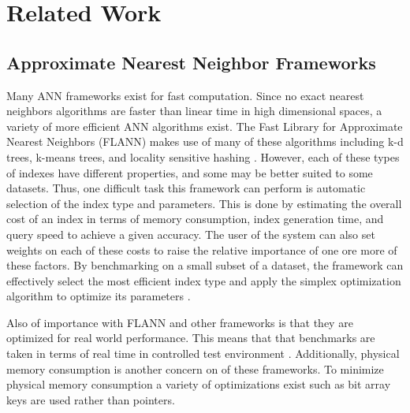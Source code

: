 \chapter{Related Work} %

\label{Related Work} %


\section{Approximate Nearest Neighbor Frameworks}

Many ANN frameworks exist for fast computation.  Since no exact nearest neighbors algorithms are faster than linear time in high dimensional spaces, a variety of more efficient ANN algorithms exist.  The Fast Library for Approximate Nearest Neighbors (FLANN) makes use of many of these algorithms including k-d trees, k-means trees, and locality sensitive hashing \citep{muja_flann_2009}.  However, each of these types of indexes have different properties, and some may be better suited to some datasets.  Thus, one difficult task this framework can perform is automatic selection of the index type and parameters.  This is done by estimating the overall cost of an index in terms of memory consumption, index generation time, and query speed to achieve a given accuracy.  The user of the system can also set weights on each of these costs to raise the relative importance of one ore more of these factors.  By benchmarking on a small subset of a dataset, the framework can effectively select the most efficient index type and apply the simplex optimization algorithm to optimize its parameters \citep{nelder1965simplex}.

Also of importance with FLANN and other frameworks is that they are optimized for real world performance.  This means that that benchmarks are taken in terms of real time in controlled test environment \citep{muja_flann_2009}.  Additionally, physical memory consumption is another concern on of these frameworks.  To minimize physical memory consumption a variety of optimizations exist such as bit array keys are used rather than pointers.